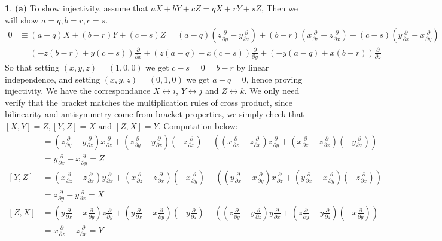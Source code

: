 \documentclass[10.5pt]{article}
\theoremstyle{definition}
\newtheorem{pb}{}
\newcommand{\tand}{\text{ and }}
\newcommand{\parx}{\frac{\partial}{\partial x}}
\newcommand{\pary}{\frac{\partial}{\partial y}}
\newcommand{\parz}{\frac{\partial}{\partial z}}
\begin{document}
    \begin{pb}
        \textbf{(a)}
        To show injectivity, assume that
        \(aX + bY + cZ = qX + rY + sZ\), Then we will show \(a = q, b = r, c = s\).
        \begin{align*}
            0 &\equiv (a-q)X + (b-r)Y + (c-s)Z = (a-q)(z\frac{\partial}{\partial y} - y\frac{\partial}{\partial z}) + (b-r)(x \frac{\partial}{\partial z} - z \frac{\partial}{\partial x}) +
            (c-s)(y \frac{\partial}{\partial x} - x \frac{\partial}{\partial y})\\
            &= (-z(b-r) + y(c-s))\frac{\partial}{\partial x} + (z(a-q)-x(c-s))\frac{\partial}{\partial y} + (-y(a-q) + x(b-r))\frac{\partial}{\partial z}
        \end{align*}
        So that setting \((x,y,z) = (1,0,0)\) we get \(c - s = 0 = b-r\) by linear independence, and setting \((x,y,z) = (0,1,0)\) we get \(a-q = 0\), hence proving injectivity.
        We have the correspondance \(X \leftrightarrow i\), \(Y \leftrightarrow j\) and \(Z \leftrightarrow k\). We only need verify that the bracket matches the multiplication rules of cross product,
        since bilinearity and antisymmetry come from bracket properties, we simply check that \([X,Y] = Z, [Y,Z] = X \tand [Z,X] = Y\). Computation below:
        \begin{align*}
            [X,Y] &= (z\pary - y\parz)x\parz + (z\pary - y\parz)(-z\parx) - \left((x\parz - z\parx)z\pary + (x\parz - z\parx)(-y\parz)\right) \\
            &= y \parx - x\pary = Z \\
            [Y,Z] &= (x\parz - z\parx)y\parx + (x\parz - z\parx)(-x\pary) - \left((y\parx - x\pary)x\parz + (y\parx - x\pary)(-z\parx)\right) \\
            &= z\pary - y\parz = X \\
            [Z,X] &= (y\parx - x\pary)z\pary + (y\parx - x\pary)(-y\parz) - \left((z\pary - y\parz)y\parx + (z\pary - y\parz)(-x\pary)\right) \\
            &= x\parz - z\parx = Y
        \end{align*}



\end{pb}
\end{document}
